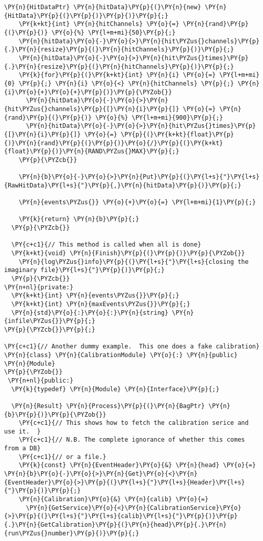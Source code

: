 \begin{Verbatim}[commandchars=\\\{\}]
    \PY{n}{HitDataPtr} \PY{n}{hitData}\PY{p}{(}\PY{n}{new} \PY{n}{HitData}\PY{p}{(}\PY{p}{)}\PY{p}{)}\PY{p}{;}
    \PY{k+kt}{int} \PY{n}{hitChannels} \PY{o}{=} \PY{n}{rand}\PY{p}{(}\PY{p}{)} \PY{o}{%} \PY{l+m+mi}{50}\PY{p}{;}
    \PY{n}{hitData}\PY{o}{-}\PY{o}{>}\PY{n}{hit\PYZus{}channels}\PY{p}{.}\PY{n}{resize}\PY{p}{(}\PY{n}{hitChannels}\PY{p}{)}\PY{p}{;}
    \PY{n}{hitData}\PY{o}{-}\PY{o}{>}\PY{n}{hit\PYZus{}times}\PY{p}{.}\PY{n}{resize}\PY{p}{(}\PY{n}{hitChannels}\PY{p}{)}\PY{p}{;}
    \PY{k}{for}\PY{p}{(}\PY{k+kt}{int} \PY{n}{i} \PY{o}{=} \PY{l+m+mi}{0} \PY{p}{;} \PY{n}{i} \PY{o}{<} \PY{n}{hitChannels} \PY{p}{;} \PY{n}{i}\PY{o}{+}\PY{o}{+}\PY{p}{)}\PY{p}{\PYZob{}}
      \PY{n}{hitData}\PY{o}{-}\PY{o}{>}\PY{n}{hit\PYZus{}channels}\PY{p}{[}\PY{n}{i}\PY{p}{]} \PY{o}{=} \PY{n}{rand}\PY{p}{(}\PY{p}{)} \PY{o}{%} \PY{l+m+mi}{900}\PY{p}{;}
      \PY{n}{hitData}\PY{o}{-}\PY{o}{>}\PY{n}{hit\PYZus{}times}\PY{p}{[}\PY{n}{i}\PY{p}{]} \PY{o}{=} \PY{p}{(}\PY{k+kt}{float}\PY{p}{)}\PY{n}{rand}\PY{p}{(}\PY{p}{)}\PY{o}{/}\PY{p}{(}\PY{k+kt}{float}\PY{p}{)}\PY{n}{RAND\PYZus{}MAX}\PY{p}{;}
    \PY{p}{\PYZcb{}}
    
    \PY{n}{b}\PY{o}{-}\PY{o}{>}\PY{n}{Put}\PY{p}{(}\PY{l+s}{"}\PY{l+s}{RawHitData}\PY{l+s}{"}\PY{p}{,}\PY{n}{hitData}\PY{p}{)}\PY{p}{;}

    \PY{n}{events\PYZus{}} \PY{o}{+}\PY{o}{=} \PY{l+m+mi}{1}\PY{p}{;} 

    \PY{k}{return} \PY{n}{b}\PY{p}{;}
  \PY{p}{\PYZcb{}}

  \PY{c+c1}{// This method is called when all is done}
  \PY{k+kt}{void} \PY{n}{Finish}\PY{p}{(}\PY{p}{)}\PY{p}{\PYZob{}}
    \PY{n}{log\PYZus{}info}\PY{p}{(}\PY{l+s}{"}\PY{l+s}{closing the imaginary file}\PY{l+s}{"}\PY{p}{)}\PY{p}{;}
  \PY{p}{\PYZcb{}}
\PY{n+nl}{private:}
  \PY{k+kt}{int} \PY{n}{events\PYZus{}}\PY{p}{;}
  \PY{k+kt}{int} \PY{n}{maxEvents\PYZus{}}\PY{p}{;}
  \PY{n}{std}\PY{o}{:}\PY{o}{:}\PY{n}{string} \PY{n}{infile\PYZus{}}\PY{p}{;}
\PY{p}{\PYZcb{}}\PY{p}{;}

\PY{c+c1}{// Another dummy example.  This one does a fake calibration}
\PY{n}{class} \PY{n}{CalibrationModule} \PY{o}{:} \PY{n}{public} \PY{n}{Module}
\PY{p}{\PYZob{}}
 \PY{n+nl}{public:}
  \PY{k}{typedef} \PY{n}{Module} \PY{n}{Interface}\PY{p}{;}

  \PY{n}{Result} \PY{n}{Process}\PY{p}{(}\PY{n}{BagPtr} \PY{n}{b}\PY{p}{)}\PY{p}{\PYZob{}}
    \PY{c+c1}{// This shows how to fetch the calibration serice and use it.  }
    \PY{c+c1}{// N.B. The complete ignorance of whether this comes from a DB}
    \PY{c+c1}{// or a file.}
    \PY{k}{const} \PY{n}{EventHeader}\PY{o}{&} \PY{n}{head} \PY{o}{=} \PY{n}{b}\PY{o}{-}\PY{o}{>}\PY{n}{Get}\PY{o}{<}\PY{n}{EventHeader}\PY{o}{>}\PY{p}{(}\PY{l+s}{"}\PY{l+s}{Header}\PY{l+s}{"}\PY{p}{)}\PY{p}{;}
    \PY{n}{Calibration}\PY{o}{&} \PY{n}{calib} \PY{o}{=}  
      \PY{n}{GetService}\PY{o}{<}\PY{n}{CalibrationService}\PY{o}{>}\PY{p}{(}\PY{l+s}{"}\PY{l+s}{calib}\PY{l+s}{"}\PY{p}{)}\PY{p}{.}\PY{n}{GetCalibration}\PY{p}{(}\PY{n}{head}\PY{p}{.}\PY{n}{run\PYZus{}number}\PY{p}{)}\PY{p}{;}
    

\end{Verbatim}
